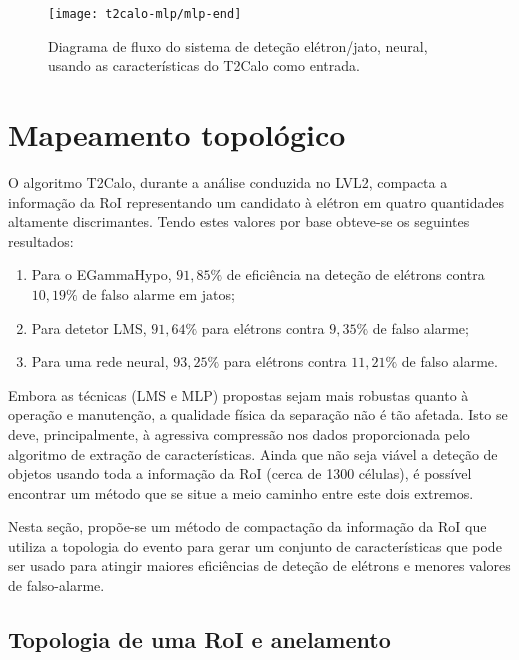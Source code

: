\begin{figure}
\begin{center}
\begin{sideways}
\texttt{[image: t2calo-mlp/mlp-end]}
\end{sideways}
\end{center}
\caption{Diagrama de fluxo do sistema de deteção elétron/jato, neural, usando as
características do T2Calo como entrada.}
\label{fig:t2calo-mlp-best-net}
\end{figure}

\section{Mapeamento topológico}

O algoritmo T2Calo, durante a análise conduzida no LVL2, compacta a informação
da RoI representando um candidato à elétron em quatro quantidades altamente
discrimantes. Tendo estes valores por base obteve-se os seguintes resultados:

\begin{enumerate}
\item Para o EGammaHypo, $91,85\%$ de eficiência na deteção de elétrons contra
$10,19\%$ de falso alarme em jatos;
\item Para detetor LMS, $91,64\%$ para elétrons contra $9,35\%$ de falso alarme;
\item Para uma rede neural, $93,25\%$ para elétrons contra $11,21\%$ de falso
alarme.
\end{enumerate}

Embora as técnicas (LMS e MLP) propostas sejam mais robustas quanto à operação
e manutenção, a qualidade física da separação não é tão afetada. Isto se deve,
principalmente, à agressiva compressão nos dados proporcionada pelo algoritmo
de extração de características. Ainda que não seja viável a deteção de objetos
usando toda a informação da RoI (cerca de 1300 células), é possível encontrar
um método que se situe a meio caminho entre este dois extremos.

Nesta seção, propõe-se um método de compactação da informação da RoI que
utiliza a topologia do evento para gerar um conjunto de características que
pode ser usado para atingir maiores eficiências de deteção de elétrons e
menores valores de falso-alarme.

\subsection{Topologia de uma RoI e anelamento}

